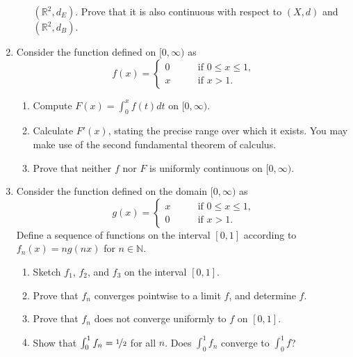 \documentclass[12pt]{article}
\newcommand{\N}{\mathbb{N}}
\newcommand{\R}{\mathbb{R}}
\begin{document}
\begin{enumerate}
\begin{enumerate}
	$(\R^2,d_E)$. Prove that it is also continuous with respect to $(X,d)$
	and $(\R^2,d_B)$.
    \end{enumerate}
  \item
    Consider the function defined on $[0,\infty)$ as
    \[
    f(x)= \left\{
    \begin{array}{ll}
      0 & \qquad \textrm{if $0\le x\le1$,} \\
      x & \qquad \textrm{if $x> 1$.}
    \end{array}
    \right.
    \]
    \begin{enumerate}
      \item Compute $F(x)=\int_0^x f(t) dt$ on $[0,\infty)$.
      \item Calculate $F'(x)$, stating the precise range over which it exists.
	You may make use of the second fundamental theorem of calculus.
      \item Prove that neither $f$ nor $F$ is uniformly continuous on $[0,\infty)$.
    \end{enumerate}
  \item Consider the function defined on the domain $[0,\infty)$ as
    \[
    g(x) = \left\{
    \begin{array}{ll}
      x & \qquad \textrm {if $0\le x \le 1$,} \\
      0 & \qquad \textrm{if $x>1$.}
    \end{array}
    \right.
    \]
    Define a sequence of functions on the interval $[0,1]$ according to
    $f_n(x)=n g(nx)$ for $n\in \N$.
    \begin{enumerate}
      \item Sketch $f_1$, $f_2$, and $f_3$ on the interval $[0,1]$.
      \item Prove that $f_n$ converges pointwise to a limit $f$, and determine
	$f$.
      \item Prove that $f_n$ does not converge uniformly to $f$ on $[0,1]$.
      \item Show that $\int_0^1 f_n = \nicefrac{1}{2}$ for all $n$. Does $\int_0^1 f_n$
	converge to $\int_0^1 f$?
    \end{enumerate}


\end{enumerate}
\end{document}
